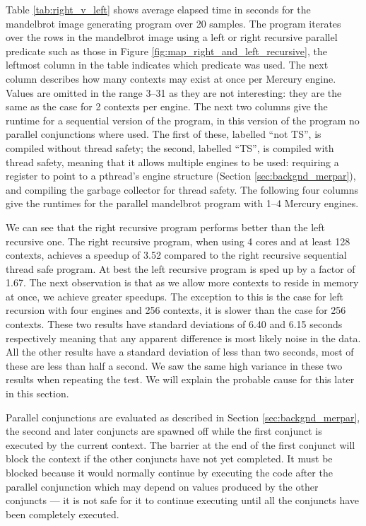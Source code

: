 Table \ref{tab:right_v_left} shows average elapsed time in seconds for the
mandelbrot image generating program over 20 samples.
The program iterates over the rows in the mandelbrot image using
a left or right recursive parallel
 predicate such as those in Figure
\ref{fig:map_right_and_left_recursive},
the leftmost column in the table indicates which predicate was used.
The next column describes how many contexts may exist at once per Mercury
engine.
Values are omitted in the range 3--31 as they are not interesting:
they are the same as the case for 2 contexts per engine.
The next two columns give the runtime for a sequential version of the
program,
in this version of the program no parallel conjunctions where used.
The first of these, labelled ``not TS'',
is compiled without thread safety;
the second, labelled ``TS'',
is compiled with thread safety, meaning that it allows multiple engines to be
used: requiring a register to point to a pthread's engine structure
(Section \ref{sec:backgnd_merpar}),
and compiling the garbage collector for thread safety.
The following four columns give the runtimes for the parallel mandelbrot
program with 1--4 Mercury engines.

We can see that the right recursive program performs better than the left
recursive one.
The right recursive program, when using 4 cores and at least 128 contexts,
achieves a speedup of 3.52 compared to the right recursive sequential thread
safe program.
At best the left recursive program is sped up by a factor of 1.67.
The next observation is that as we allow more contexts to reside in memory
at once,
we achieve greater speedups.
The exception to this is the case for left recursion with four engines and
256 contexts, it is slower than the case for 256 contexts.
These two results have standard deviations of 6.40 and 6.15 seconds
respectively meaning that any apparent difference is most likely
noise in the data.
All the other results have a standard deviation of less than two seconds,
most of these are less than half a second.
We saw the same high variance in these two results when repeating the test.
We will explain the probable cause for this later in this section.

Parallel conjunctions are evaluated as described in Section
\ref{sec:backgnd_merpar},
the second and later conjuncts are spawned off while the first conjunct is
executed by the current context.
The barrier at the end of the first conjunct will block the context if
the other conjuncts have not yet completed.
It must be blocked because it would normally continue by executing the code
after the parallel conjunction
which may depend on values produced by the other conjuncts ---
it is not safe for it to continue executing until all the conjuncts have
been completely executed.

